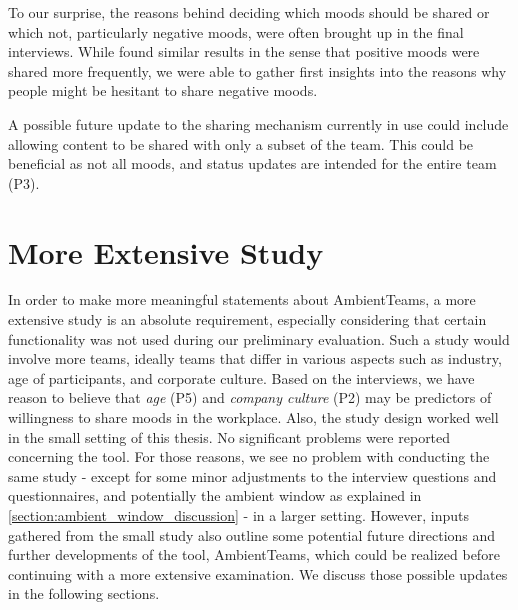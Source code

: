 To our surprise, the reasons behind deciding which moods should be shared or which not, particularly negative moods, were often brought up in the final interviews. While \textcite{dullemond2013fixing} found similar results in the sense that positive moods were shared more frequently, we were able to gather first insights into the reasons why people might be hesitant to share negative moods. 

A possible future update to the sharing mechanism currently in use could include allowing content to be shared with only a subset of the team. This could be beneficial as not all moods, and status updates are intended for the entire team (P3). 

\section{More Extensive Study}
In order to make more meaningful statements about AmbientTeams, a more extensive study is an absolute requirement, especially considering that certain functionality was not used during our preliminary evaluation. Such a study would involve more teams, ideally teams that differ in various aspects such as industry, age of participants, and corporate culture. Based on the interviews, we have reason to believe that \textit{age} (P5) and \textit{company culture} (P2) may be predictors of willingness to share moods in the workplace. Also, the study design worked well in the small setting of this thesis. No significant problems were reported concerning the tool. For those reasons, we see no problem with conducting the same study - except for some minor adjustments to the interview questions and questionnaires, and potentially the ambient window as explained in \autoref{section:ambient_window_discussion} - in a larger setting. However, inputs gathered from the small study also outline some potential future directions and further developments of the tool, AmbientTeams, which could be realized before continuing with a more extensive examination. We discuss those possible updates in the following sections.


